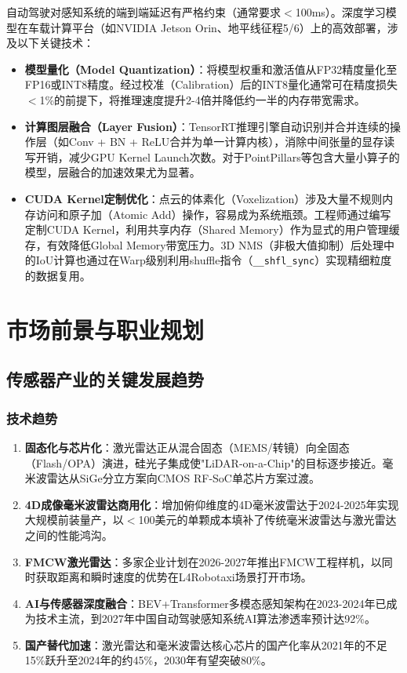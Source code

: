 \documentclass[12pt,a4paper,openany,UTF8]{ctexbook}
\begin{document}
自动驾驶对感知系统的端到端延迟有严格约束（通常要求$<$100ms）。深度学习模型在车载计算平台（如NVIDIA Jetson Orin、地平线征程5/6）上的高效部署，涉及以下关键技术：

\begin{itemize}
    \item \textbf{模型量化（Model Quantization）}：将模型权重和激活值从FP32精度量化至FP16或INT8精度。经过校准（Calibration）后的INT8量化通常可在精度损失$<$1\%的前提下，将推理速度提升2-4倍并降低约一半的内存带宽需求。
    \item \textbf{计算图层融合（Layer Fusion）}：TensorRT推理引擎自动识别并合并连续的操作层（如Conv + BN + ReLU合并为单一计算内核），消除中间张量的显存读写开销，减少GPU Kernel Launch次数。对于PointPillars等包含大量小算子的模型，层融合的加速效果尤为显著。
    \item \textbf{CUDA Kernel定制优化}：点云的体素化（Voxelization）涉及大量不规则内存访问和原子加（Atomic Add）操作，容易成为系统瓶颈。工程师通过编写定制CUDA Kernel，利用共享内存（Shared Memory）作为显式的用户管理缓存，有效降低Global Memory带宽压力。3D NMS（非极大值抑制）后处理中的IoU计算也通过在Warp级别利用shuffle指令（\texttt{\_\_shfl\_sync}）实现精细粒度的数据复用。
\end{itemize}

\clearpage

\chapter{市场前景与职业规划}

\section{传感器产业的关键发展趋势}

\subsection{技术趋势}

\begin{enumerate}
    \item \textbf{固态化与芯片化}：激光雷达正从混合固态（MEMS/转镜）向全固态（Flash/OPA）演进，硅光子集成使"LiDAR-on-a-Chip"的目标逐步接近。毫米波雷达从SiGe分立方案向CMOS RF-SoC单芯片方案过渡。
    \item \textbf{4D成像毫米波雷达商用化}：增加俯仰维度的4D毫米波雷达于2024-2025年实现大规模前装量产，以$<$100美元的单颗成本填补了传统毫米波雷达与激光雷达之间的性能鸿沟。
    \item \textbf{FMCW激光雷达}：多家企业计划在2026-2027年推出FMCW工程样机，以同时获取距离和瞬时速度的优势在L4Robotaxi场景打开市场。
    \item \textbf{AI与传感器深度融合}：BEV+Transformer多模态感知架构在2023-2024年已成为技术主流，到2027年中国自动驾驶感知系统AI算法渗透率预计达92\%。
    \item \textbf{国产替代加速}：激光雷达和毫米波雷达核心芯片的国产化率从2021年的不足15\%跃升至2024年的约45\%，2030年有望突破80\%。
\end{enumerate}
\end{document}
